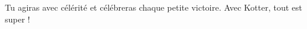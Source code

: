 %
    {Tu agiras avec célérité et célébreras chaque petite victoire.}%
    {Avec Kotter, tout est super !}
